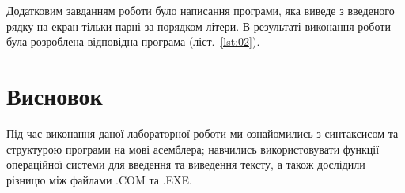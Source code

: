 \documentclass[a4paper,oneside,DIV=12,12pt]{scrartcl}
\begin{document}
		Додатковим завданням роботи було написання програми, яка виведе з введеного рядку на екран тільки парні за порядком літери. В результаті виконання роботи була розроблена відповідна програма (ліст.~\ref{lst:02}).
				
		
	\section{Висновок}
		Під час виконання даної лабораторної роботи ми ознайомились з синтаксисом та структурою програми на мові асемблера; навчились використовувати функції операційної системи для введення та виведення тексту, а також дослідили різницю між файлами .COM та .EXE.
\end{document}
